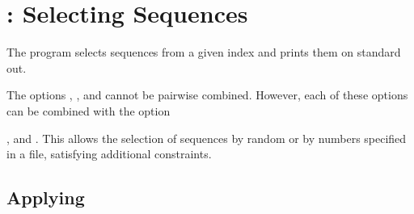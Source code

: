 \documentclass[12pt,titlepage]{article}
\makeatletter
\newcommand{\Ignoreregexp}[1]{}
\newcommand{\Ignoreregexp}[1]{#1}
\newcommand{\Program}[2]{\index{#2@#1}}
\makeatother
\begin{document}
\section[\VSS]{\VSS: Selecting Sequences}\label{VSS}\Program{\VSS}{vseqselect}
The program \VSS selects sequences from a given index and prints them
on standard out.

\begin{Showprogramwithoptions}{\VSS}{}






\Ignoreregexp{

\Option{matchdesc}{\Showoptionarg{regexp}}{
Select all sequences whose description contains a substring
matching the given regular expression. \index{expression!regular}
The syntax of the regular expressions
follows the standard Unix style, see Appendix \ref{Regexpdef}.
This option can be combined
with the options \Showoption{minlength} and \Showoption{maxlength} to further
restrict the output sequences.
}

}

\Helpoption

\end{Showprogramwithoptions}

The options , ,
and  cannot be pairwise combined. However, each of
these options can be combined with the option
\Ignoreregexp{
\Showoption{matchdesc},}
, and .
This allows the selection of 
sequences by random or by numbers specified in a file, 
satisfying additional constraints.

\subsection{Applying \VSS}\label{ApplyingVSS}
\end{document}
